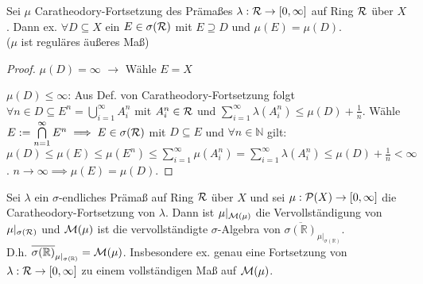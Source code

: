 \documentclass[11pt,a4paper,fleqn,openany]{report}
\begin{document}
    \begin{theorem}
      Sei $\mu$ Caratheodory-Fortsetzung des Prämaßes $\lambda: \mathcal{R} \to [0,\infty]$ auf Ring $\mathcal{R}$ über $X$. Dann ex. $\forall D \subseteq X$ ein $E \in \sigma(\mathcal{R})$ mit $E \supseteq D$ und $\mu(E) = \mu(D)$.\\
      ($\mu$ ist \glqq reguläres \grqq äußeres Maß)
    \end{theorem}

    \begin{proof}
      \item $\mu(D) = \infty$ $\rightarrow$ Wähle $E = X$
      \item $\mu(D) \leq \infty$: Aus Def. von Caratheodory-Fortsetzung folgt $\forall n \in D \subseteq E^n = \bigcup\limits_{i=1}^{\infty}A_i^n$ mit $A_i^n \in \mathcal{R}$  und $\sum\limits_{i=1}^{\infty}\lambda(A_i^n) \leq \mu(D) + \frac{1}{n}$. Wähle $E := \bigcap\limits_{n=1}^{\infty} E^n \implies E \in \sigma(\mathcal{R})$ mit $D \subseteq E$ und $\forall n \in \mathbb{N}$ gilt: \\
      $\mu(D) \leq \mu(E) \leq \mu(E^n) \leq \sum\limits_{i=1}^{\infty}\mu(A_i^n) = \sum\limits_{i=1}^{\infty}\lambda(A_i^n) \leq \mu(D) + \frac{1}{n} < \infty$. $n \rightarrow \infty \implies \mu(E) = \mu(D)$.
    \end{proof}

    \begin{theorem}[i.A. II.16]
      Sei $\lambda$ ein $\sigma$-endliches Prämaß auf Ring $\mathcal{R}$ über $X$ und sei $\mu: \mathcal{P}(X) \to [0,\infty]$ die Caratheodory-Fortsetzung von $\lambda$. Dann ist $\mu|_{\mathcal{M}(\mu)}$ die Vervollständigung von $\mu|_{\sigma(\mathcal{R})}$ und $\mathcal{M}(\mu)$ ist die vervollständigte $\sigma$-Algebra von $\overline{\sigma(\mathbb{R})}_{\mu|_{\sigma(\mathbb{R})}}$.\\
      D.h. $\overline{\sigma(\mathbb{R})}_{\mu|_{\sigma(\mathbb{R})}} = \mathcal{M}(\mu)$. Insbesondere ex. genau eine Fortsetzung von $\lambda: \mathcal{R} \to [0, \infty]$ zu einem vollständigen Maß auf $\mathcal{M}(\mu)$.
    \end{theorem}
\end{document}
